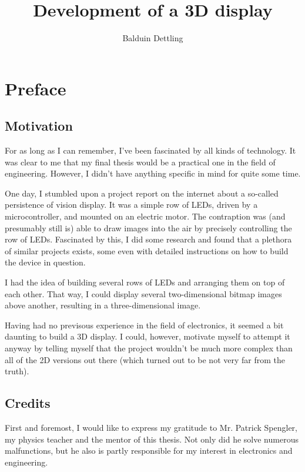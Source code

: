 \documentclass[a4paper, 11pt, titlepage]{report}
\begin{document}
\title{Development of a 3D display}
\author{Balduin Dettling}

\maketitle

\chapter*{Preface}


\section*{Motivation}

For as long as I can remember, I've been fascinated by all kinds of technology. 
It was clear to me that my final thesis would be a practical one in the field of engineering.
However, I didn't have anything specific in mind for quite some time.

One day, I stumbled upon a project report on the internet about a so-called persistence of 
vision display. It was a simple row of LEDs, driven by a microcontroller, and mounted on an 
electric motor. The contraption was (and presumably still is) able to draw images into the 
air by precisely controlling the row of LEDs. Fascinated by this, I did some research and 
found that a plethora of similar projects exists, some even with detailed instructions on how 
to build the device in question.

I had the idea of building several rows of LEDs and arranging them on top of each other. 
That way, I could display several two-dimensional bitmap images above another, resulting in a
three-dimensional image.

Having had no previsous experience in the field of electronics, it seemed a bit daunting to 
build a 3D display. I could, however, motivate myself to attempt it anyway by telling myself
that the project wouldn't be much more complex than all of the 2D versions out there (which 
turned out to be not very far from the truth).


\section*{Credits}

First and foremost, I would like to express my gratitude to Mr. Patrick Spengler, my physics
teacher and the mentor of this thesis. Not only did he solve numerous malfunctions, but he also
is partly responsible for my interest in electronics and engineering.
\end{document}
